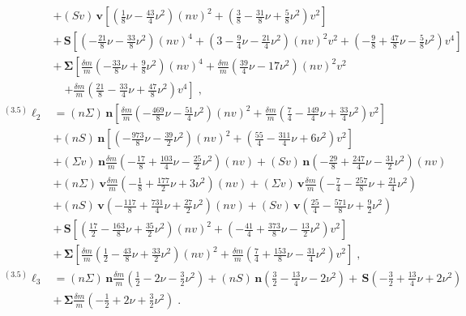 {\begin{align}
& + (Sv) \, \mathbf{v} \left[\left(\frac{1}{8} \nu -\frac{43}{4} \nu^2\right) (nv)^2+\left(\frac{3}{8} -\frac{31}{8} \nu + \frac{5}{8} \nu^2\right) v^{2}\right] \nonumber \\
& + \, \mathbf{S} \left[\left(-\frac{21}{8} \nu -\frac{33}{8} \nu^2\right) (nv)^4+\left(3 -\frac{9}{4} \nu -\frac{21}{4} \nu^2\right) (nv)^2 v^{2}+\left(-\frac{9}{8} + \frac{47}{8} \nu -\frac{5}{8} \nu^2\right) v^{4}\right] \nonumber \\
& + \, \mathbf{\Sigma} \left[\frac{\delta m}{m}\left(-\frac{33}{8} \nu + \frac{9}{8} \nu^2\right) (nv)^4+\frac{\delta m}{m}\left(\frac{39}{4} \nu -17 \nu^2\right) (nv)^2 v^{2} \right. \nonumber \\
& \quad \left. +\frac{\delta m}{m}\left(\frac{21}{8} -\frac{33}{4} \nu + \frac{47}{8} \nu^2\right) v^{4}\right] \;,\nonumber \\
    {}^{(3.5)}\mathbf{\boldsymbol\ell}_{2} &= (n\Sigma ) \, \mathbf{n} \left[\frac{\delta m}{m}\left(-\frac{469}{8} \nu -\frac{51}{4} \nu^2\right) (nv)^2+\frac{\delta m}{m}\left(\frac{7}{4} -\frac{149}{4} \nu + \frac{33}{4} \nu^2\right) v^{2}\right] \nonumber \\
& + (nS) \, \mathbf{n} \left[\left(-\frac{973}{8} \nu -\frac{39}{2} \nu^2\right) (nv)^2+\left(\frac{55}{4} -\frac{311}{4} \nu + 6 \nu^2\right) v^{2}\right] \nonumber \\
& + (\Sigma v) \, \mathbf{n} \frac{\delta m}{m}\left(-\frac{17}{8} + \frac{103}{4} \nu -\frac{25}{2} \nu^2\right) (nv) + (Sv) \, \mathbf{n} \left(-\frac{29}{8} + \frac{247}{4} \nu -\frac{31}{2} \nu^2\right) (nv) \nonumber \\
& + (n\Sigma ) \, \mathbf{v} \frac{\delta m}{m}\left(-\frac{1}{8} + \frac{177}{2} \nu + 3 \nu^2\right) (nv) + (\Sigma v) \, \mathbf{v} \frac{\delta m}{m}\left(-\frac{7}{4} -\frac{257}{8} \nu + \frac{21}{4} \nu^2\right) \nonumber \\
& + (nS) \, \mathbf{v} \left(-\frac{117}{8} + \frac{731}{4} \nu + \frac{27}{2} \nu^2\right) (nv) + (Sv) \, \mathbf{v} \left(\frac{25}{4} -\frac{571}{8} \nu + \frac{9}{2} \nu^2\right) \nonumber \\
& + \, \mathbf{S} \left[\left(\frac{17}{2} -\frac{163}{8} \nu + \frac{35}{2} \nu^2\right) (nv)^2+\left(-\frac{41}{4} + \frac{373}{8} \nu -\frac{13}{2} \nu^2\right) v^{2}\right] \nonumber \\
& + \, \mathbf{\Sigma} \left[\frac{\delta m}{m}\left(\frac{1}{2} -\frac{43}{8} \nu + \frac{33}{2} \nu^2\right) (nv)^2+\frac{\delta m}{m}\left(\frac{7}{4} + \frac{153}{8} \nu -\frac{31}{4} \nu^2\right) v^{2}\right] \;,\nonumber \\ 
    {}^{(3.5)}\mathbf{\boldsymbol\ell}_{3} &= (n\Sigma ) \, \mathbf{n} \frac{\delta m}{m}\left(\frac{1}{2} -2 \nu -\frac{3}{2} \nu^2\right) + (nS) \, \mathbf{n} \left(\frac{3}{2} -\frac{13}{4} \nu -2 \nu^2\right) + \, \mathbf{S} \left(-\frac{3}{2} + \frac{13}{4} \nu + 2 \nu^2\right) \nonumber \\
& + \, \mathbf{\Sigma} \frac{\delta m}{m}\left(-\frac{1}{2} + 2 \nu + \frac{3}{2} \nu^2\right) \;.
\end{align}}